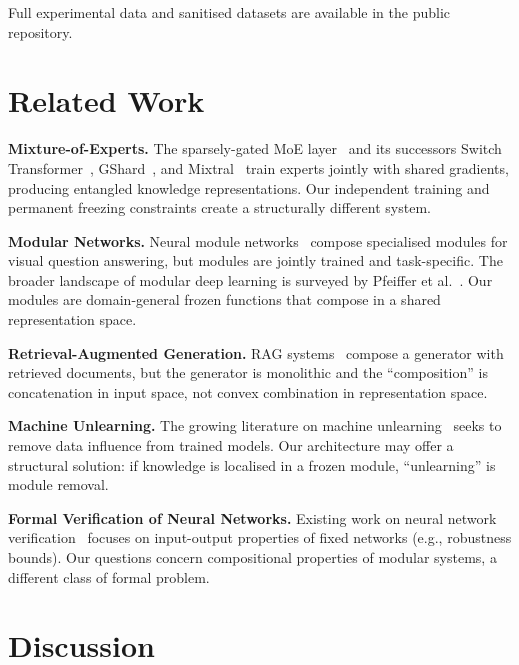 \documentclass[11pt,a4paper]{article}
\begin{document}
Full experimental data and sanitised datasets are available in the public repository.

\section{Related Work}
\label{sec:related}

\textbf{Mixture-of-Experts.} The sparsely-gated MoE layer~\cite{shazeer2017outrageously} and its successors Switch Transformer~\cite{fedus2022switch}, GShard~\cite{lepikhin2021gshard}, and Mixtral~\cite{jiang2024mixtral} train experts jointly with shared gradients, producing entangled knowledge representations. Our independent training and permanent freezing constraints create a structurally different system.

\textbf{Modular Networks.} Neural module networks~\cite{andreas2016neural} compose specialised modules for visual question answering, but modules are jointly trained and task-specific. The broader landscape of modular deep learning is surveyed by Pfeiffer et al.~\cite{pfeiffer2023modular}. Our modules are domain-general frozen functions that compose in a shared representation space.

\textbf{Retrieval-Augmented Generation.} RAG systems~\cite{lewis2020retrieval} compose a generator with retrieved documents, but the generator is monolithic and the ``composition'' is concatenation in input space, not convex combination in representation space.

\textbf{Machine Unlearning.} The growing literature on machine unlearning~\cite{bourtoule2021machine} seeks to remove data influence from trained models. Our architecture may offer a structural solution: if knowledge is localised in a frozen module, ``unlearning'' is module removal.

\textbf{Formal Verification of Neural Networks.} Existing work on neural network verification~\cite{katz2017reluplex} focuses on input-output properties of fixed networks (e.g., robustness bounds). Our questions concern compositional properties of modular systems, a different class of formal problem.

\section{Discussion}
\label{sec:discussion}
\end{document}
